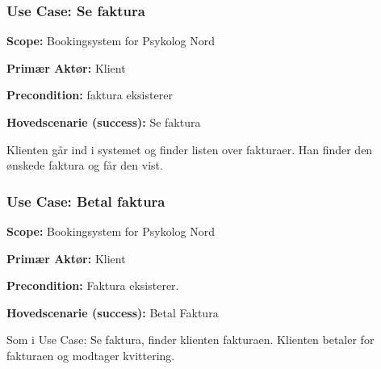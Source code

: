 \subsubsection{Use Case: Se faktura}
{\setlength{\parindent}{0cm}
\textbf{Scope:} Bookingsystem for Psykolog Nord

\textbf{Primær Aktør:} Klient

\textbf{Precondition: }faktura eksisterer

\textbf{Hovedscenarie (success):} Se faktura

Klienten går ind i systemet og finder listen over fakturaer. 
Han finder den ønskede faktura og får den vist.
}


\subsubsection{Use Case: Betal faktura}
{\setlength{\parindent}{0cm}
\textbf{Scope:} Bookingsystem for Psykolog Nord

\textbf{Primær Aktør:} Klient

\textbf{Precondition:} Faktura eksisterer.

\textbf{Hovedscenarie (success):} Betal Faktura

Som i Use Case: Se faktura, finder klienten fakturaen. Klienten betaler for fakturaen og modtager kvittering.
}